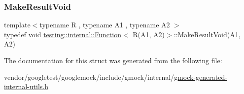 \subsubsection{\texorpdfstring{Make\+Result\+Void}{MakeResultVoid}}
{\footnotesize\ttfamily template$<$typename R , typename A1 , typename A2 $>$ \\
typedef void \hyperlink{structtesting_1_1internal_1_1_function}{testing\+::internal\+::\+Function}$<$ R(A1, A2)$>$\+::Make\+Result\+Void(A1, A2)}



The documentation for this struct was generated from the following file\+:\begin{DoxyCompactItemize}
\item 
vendor/googletest/googlemock/include/gmock/internal/\hyperlink{gmock-generated-internal-utils_8h}{gmock-\/generated-\/internal-\/utils.\+h}\end{DoxyCompactItemize}
